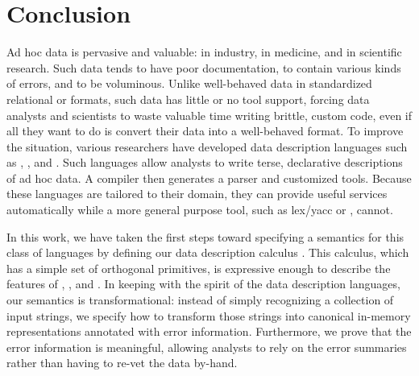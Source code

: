 \section{Conclusion} 
\label{sec:conclusion}
Ad hoc data is pervasive and valuable: in industry, in medicine, and in scientific research.  Such data tends to have poor documentation, to contain various kinds of errors, and to be voluminous.  Unlike well-behaved data in standardized relational or \xml{} formats, such data has little or no tool support, forcing data analysts and scientists to waste valuable time writing brittle, custom code, even if all they want to do is convert their data into a well-behaved format.  To improve the situation, various researchers have developed data description languages such as \pads{}, \datascript{}, and \packettypes{}.  Such languages allow analysts to write terse, declarative descriptions of ad hoc data.  A compiler then generates a parser and customized tools.  Because these languages are tailored to their domain, they can provide useful services automatically while a more general purpose tool, such as lex/yacc or \perl{}, cannot.

In this work, we have taken the first steps toward specifying a semantics for this class of languages by defining our data description calculus \ddc{}.  This calculus, which has a simple set of orthogonal primitives, is expressive enough to describe the features of \pads{}, \datascript{}, and \packettypes{}.  In keeping with the spirit of the data description languages, our semantics is transformational: instead of simply recognizing a collection of input strings, we specify how to transform those strings into canonical in-memory representations annotated with error information.  Furthermore, we prove that the error information is meaningful, allowing analysts to rely on the error summaries rather than having to re-vet the data by-hand. 

